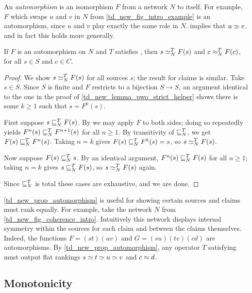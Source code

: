 An \emph{automorphism} is an isomorphism $F$ from a network $N$ to itself. For
example, $F$ which swaps $u$ and $v$ in $N$ from
\cref{td_new_fig_intro_example} is an automorphism, since $u$ and $v$ play
exactly the same role in $N$. \symmetry{} implies that $u \simeq v$, and in fact
this holds more generally.

\begin{proposition}
    \label{td_new_prop_automorphism}
    If $F$ is an automorphism on $N$ and $T$ satisfies \symmetry{}, then $s
    \simeq_N^T F(s)$ and $c \approx_N^T F(c)$, for all $s \in S$ and $c \in C$.
\end{proposition}

\begin{proof}
    We show $s \simeq_N^T F(s)$ for all sources $s$; the result for claims is
    similar.
    Take $s \in S$. Since $S$ is finite and $F$ restricts to a bijection $S \to
    S$, an argument identical to the one in the proof of
    \cref{td_new_lemma_pwo_strict_helper} shows there is some $k \ge 1$ such
    that $s = F^k(s)$.

    First suppose $s \sqsubseteq_N^T F(s)$. By \symmetry{} we may apply $F$ to both
    sides; doing so repeatedly yields $F^n(s) \sqsubseteq_N^T F^{n+1}(s)$ for all $n
    \ge 1$. By transitivity of $\sqsubseteq_N^T$, we get $F(s) \sqsubseteq_N^T F^n(s)$.
    Taking $n = k$ gives $F(s) \sqsubseteq_N^T F^k(s) = s$, so $s \simeq_N^T F(s)$.

    Now suppose $F(s) \sqsubseteq_N^T s$. By an identical argument, $F^n(s) \sqsubseteq_N^T
    F(s)$ for all $n \ge 1$; taking $n = k$ gives $s \sqsubseteq_N^T F(s)$, so $s
    \simeq_N^T F(s)$ again.

    Since $\sqsubseteq_N^T$ is total these cases are exhaustive, and we are done.

\end{proof}

\cref{td_new_prop_automorphism} is useful for showing certain sources and
claims must rank equally. For example, take the network $N$ from
\cref{td_new_fig_coherence_intro}. Intuitively this network displays internal
symmetry within the sources for each claim and between the claims themselves.
Indeed, the functions $F = (st)(uv)$ and $G = (su)(tv)(cd)$ are automorphisms.
By \cref{td_new_prop_automorphism}, any operator $T$ satisfying \symmetry{}
must output flat rankings $s \simeq t \simeq u \simeq v$ and $c \approx d$.

\subsection{Monotonicity}

